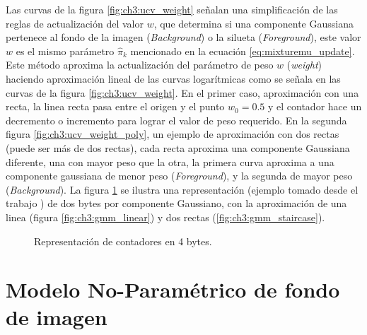 Las curvas de la figura \ref{fig:ch3:ucv_weight} señalan una simplificación de las reglas de actualización del valor $w$, que determina si una componente Gaussiana pertenece al fondo de la imagen (\textit{Background}) o la silueta (\textit{Foreground}), este valor $w$ es el mismo parámetro $\hat{\pi}_k$ mencionado en la ecuación \ref{eq:mixturemu_update}. Este método aproxima la actualización del parámetro de peso $w$ (\textit{weight}) haciendo aproximación lineal de las curvas logarítmicas como se señala en las curvas de la figura \ref{fig:ch3:ucv_weight}. En el primer caso, aproximación con una recta, la linea recta pasa entre el origen y el punto $w_0=0.5$ y el contador hace un decremento o incremento para lograr el valor de peso requerido. En la segunda figura \ref{fig:ch3:ucv_weight_poly}, un ejemplo de aproximación con dos rectas (puede ser más de dos rectas), cada recta aproxima una componente Gaussiana diferente, una con mayor peso que la otra, la primera curva aproxima a una componente gaussiana de menor peso (\textit{Foreground}), y la segunda de mayor peso (\textit{Background}). La figura \ref{fig:ch3:gmm_bytes} se ilustra una representación (ejemplo tomado desde el trabajo \cite{salvadori_gaussian_2012}) de dos bytes por componente Gaussiano, con la aproximación de una linea (figura \ref{fig:ch3:gmm_linear}) y dos rectas (\ref{fig:ch3:gmm_staircase}).

\begin{figure}[!h]
\centering     %
{}
\caption[Representación contadores en 4 bytes]{Representación de contadores en 4 bytes. }
\label{fig:ch3:gmm_bytes}
\end{figure}



\section{Modelo No-Paramétrico de fondo de imagen}
\label{sec:modelo_noparametrico}

